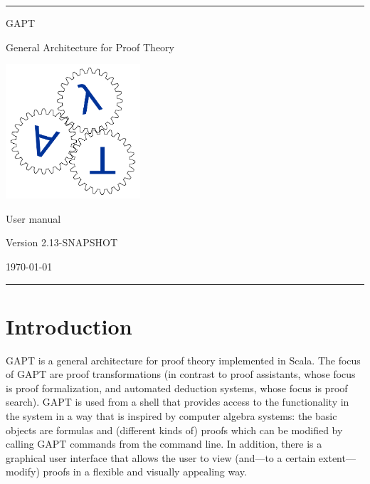 \documentclass[a4paper,11pt]{book}
\begin{document}
\begin{titlepage}
\begin{center}

\hrule

\vspace*{20mm}

{\Huge GAPT}

\vspace*{5mm}

{\huge General Architecture for Proof Theory}

\vspace*{20mm}

\includegraphics[keepaspectratio,width=5cm]{logo}

\vspace*{20mm}

{\Huge User manual}

\vspace*{10mm}
{\Large Version 2.13-SNAPSHOT}
\vspace*{10mm}

{\Large \today}

\vspace*{20mm}

\hrule
\end{center}

\end{titlepage}

\listoffixmes

\setcounter{tocdepth}{1}
\tableofcontents

\chapter{Introduction}

GAPT is a general architecture for proof theory implemented in Scala.
The focus of GAPT are proof transformations (in contrast to proof assistants,
whose focus is proof formalization, and automated deduction systems, whose focus
is proof search). GAPT is used from a shell that provides access to the functionality
in the system in a way that is inspired by computer algebra systems: the basic
objects are formulas and (different kinds of) proofs which can be modified
by calling GAPT commands from the command line. In addition, there
is a graphical user interface that allows the user to view (and—to a certain extent—
modify) proofs in a flexible and visually appealing way.
\end{document}
